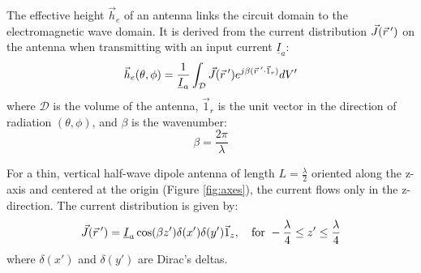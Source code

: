 The effective height $\vec{h}_e$ of an antenna links the circuit domain to the electromagnetic wave domain. It is derived from the current distribution $\vec{J}(\vec{r}\hspace{0.2em}')$ on the antenna when transmitting with an input current $\underline{I}_a$:
\begin{equation}
	\vec{h}_e(\theta, \phi) = \frac{1}{\underline{I}_a} \int_{\mathcal{D}} \vec{J}(\vec{r}\hspace{0.2em}') e^{j\beta(\vec{r}\hspace{0.2em}' \cdot \vec{1}_r)} dV'
	\label{eq:he_general}
\end{equation}
\vspace{0.5em}
where $\mathcal{D}$ is the volume of the antenna, $\vec{1}_r$ is the unit vector in the direction of radiation $(\theta, \phi)$, and $\beta$ is the wavenumber:
\begin{equation}
	\beta = \frac{2\pi}{\lambda}
\end{equation}

For a thin, vertical half-wave dipole antenna of length $L=\frac{\lambda}{2}$ oriented along the z-axis and centered at the origin (Figure \ref{fig:axes}), the current flows only in the z-direction. The current distribution is given by:
\begin{equation}
	\vec{J}(\vec{r}\hspace{0.2em}') = \underline{I}_a \cos(\beta z') \delta(x') \delta(y') \vec{1}_z, \quad \text{for } -\frac{\lambda}{4} \le z' \le \frac{\lambda}{4}
\end{equation}
\vspace{0.5em}
where $\delta(x')$ and $\delta(y')$ are Dirac's deltas.


